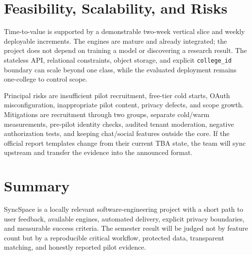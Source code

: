 \documentclass[11pt,a4paper]{article}
\begin{document}
\section{Feasibility, Scalability, and Risks}

Time-to-value is supported by a demonstrable two-week vertical slice and weekly deployable increments. The engines are mature and already integrated; the project does not depend on training a model or discovering a research result. The stateless API, relational constraints, object storage, and explicit \texttt{college\_id} boundary can scale beyond one class, while the evaluated deployment remains one-college to control scope.

Principal risks are insufficient pilot recruitment, free-tier cold starts, OAuth misconfiguration, inappropriate pilot content, privacy defects, and scope growth. Mitigations are recruitment through two groups, separate cold/warm measurements, pre-pilot identity checks, audited tenant moderation, negative authorization tests, and keeping chat/social features outside the core. If the official report templates change from their current TBA state, the team will sync upstream and transfer the evidence into the announced format.

\section{Summary}

SyncSpace is a locally relevant software-engineering project with a short path to user feedback, available engines, automated delivery, explicit privacy boundaries, and measurable success criteria. The semester result will be judged not by feature count but by a reproducible critical workflow, protected data, transparent matching, and honestly reported pilot evidence.
\end{document}
